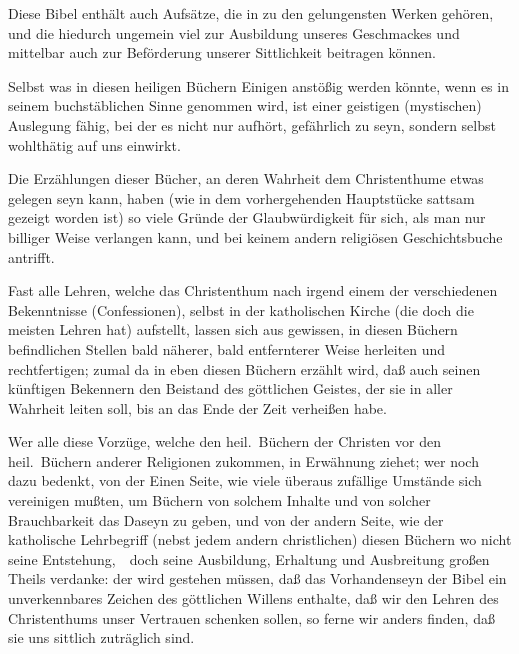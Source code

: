 \begin{aufza}
\begin{aufzb}
\item Diese Bibel enthält auch Aufsätze, die in  zu den gelungensten Werken gehören, und die hiedurch ungemein viel zur Ausbildung unseres Geschmackes und mittelbar auch zur Beförderung unserer Sittlichkeit beitragen können.
\item Selbst was in diesen heiligen Büchern Einigen anstößig werden könnte, wenn es in seinem buchstäblichen Sinne genommen wird, ist einer geistigen (mystischen) Auslegung fähig, bei der es nicht nur aufhört, gefährlich zu seyn, sondern selbst wohlthätig auf uns einwirkt.
\item Die Erzählungen dieser Bücher, an deren Wahrheit dem Christenthume etwas gelegen seyn kann, haben (wie in dem vorhergehenden Hauptstücke sattsam gezeigt worden ist) so viele Gründe der Glaubwürdigkeit für sich, als man nur billiger Weise verlangen kann, und bei keinem andern religiösen Geschichtsbuche antrifft.
\item Fast alle Lehren, welche das Christenthum nach irgend einem der verschiedenen Bekenntnisse (Confessionen), selbst in der katholischen Kirche (die doch die meisten Lehren hat) aufstellt, lassen sich aus gewissen, in diesen Büchern befindlichen Stellen bald näherer, bald entfernterer Weise herleiten und rechtfertigen; zumal da in eben diesen Büchern erzählt wird, daß  auch seinen künftigen Bekennern den Beistand des göttlichen Geistes, der sie in aller Wahrheit leiten soll, bis an das Ende der Zeit verheißen habe.
\end{aufzb}
\item Wer alle diese Vorzüge, welche den heil.\ Büchern der Christen vor den heil.\ Büchern anderer Religionen zukommen, in Erwähnung ziehet; wer noch dazu bedenkt, von der Einen Seite, wie viele überaus zufällige Umstände sich vereinigen mußten, um Büchern von solchem Inhalte und von solcher Brauchbarkeit das Daseyn zu geben, und von der andern Seite, wie der katholische Lehrbegriff (nebst jedem andern christlichen) diesen Büchern wo nicht seine Entstehung,~\ doch seine Ausbildung, Erhaltung und Ausbreitung großen Theils verdanke: der wird gestehen müssen, daß das Vorhandenseyn der Bibel ein unverkennbares Zeichen des göttlichen Willens enthalte, daß wir den Lehren des Christenthums unser Vertrauen schenken sollen, so ferne wir anders finden, daß sie uns sittlich zuträglich sind.
\end{aufza}

